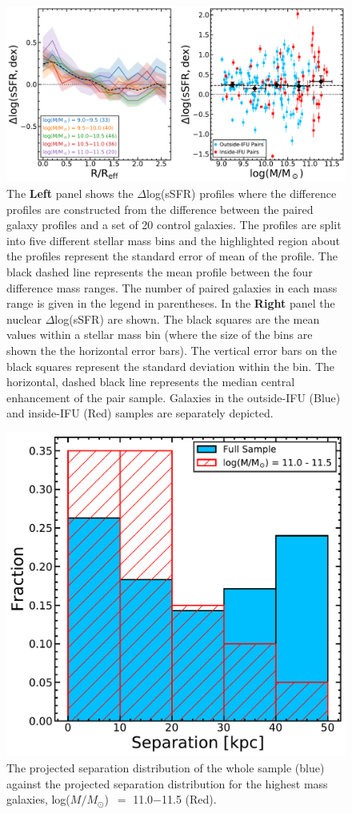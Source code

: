\documentclass[iop,revtex4,twocolumn,apj,numberedappendix,appendixfloats]{emulateapj}
\newcommand{\logm}{log($M/M_{\odot}$)}
\begin{document}
\begin{figure}
\centering
\includegraphics[width=0.8\linewidth]{fig/ssfr_mass.pdf}
\caption[]{The \textbf{Left} panel shows the $\Delta$log(sSFR) profiles where the difference profiles are constructed from the difference between the paired galaxy profiles and a set of 20 control galaxies. The profiles are split into five different stellar mass bins and the highlighted region about the profiles represent the standard error of mean of the profile. The black dashed line represents the mean profile between the four difference mass ranges. The number of paired galaxies in each mass range is given in the legend in parentheses. In the \textbf{Right} panel the nuclear $\Delta$log(sSFR) are shown. The black squares are the mean values within a stellar mass bin (where the size of the bins are shown the the horizontal error bars). The vertical error bars on the black squares represent the standard deviation within the bin. The horizontal, dashed black line represents the median central enhancement of the pair sample. Galaxies in the outside-IFU (Blue) and inside-IFU (Red) samples are separately depicted.}
\label{fig:ssfr_mass}
\end{figure}

\begin{figure}
\centering
\includegraphics[width=0.8\linewidth]{fig/sep_hist.pdf}
\caption[]{The projected separation distribution of the whole sample (blue) against the projected separation distribution for the highest mass galaxies, \logm\ $=$ 11.0$-$11.5 (Red). }
\label{fig:sep_hist}
\end{figure}
\end{document}
